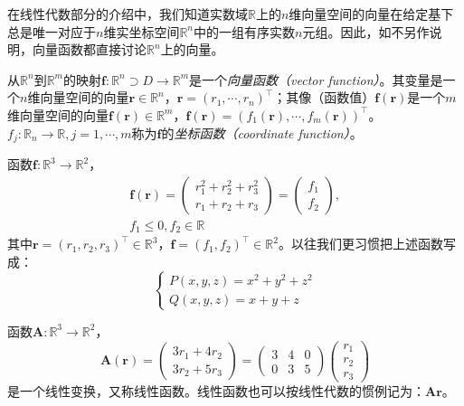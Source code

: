 \documentclass[main.tex]{subfiles}
\begin{document}
在线性代数部分的介绍中，我们知道实数域$\mathbb{R}$上的$n$维向量空间的向量在给定基下总是唯一对应于$n$维实坐标空间$\mathbb{R}^n$中的一组有序实数$n$元组。因此，如不另作说明，向量函数都直接讨论$\mathbb{R}^n$上的向量。

\begin{definition}[向量函数]\label{def:II.4.1}
    从$\mathbb{R}^n$到$\mathbb{R}^m$的映射$\mathbf{f}:\mathbb{R}^n\supset D\rightarrow\mathbb{R}^m$是一个\emph{向量函数（vector function）}。其变量是一个$n$维向量空间的向量$\mathbf{r}\in\mathbb{R}^n$，$\mathbf{r}=\left(r_1,\cdots,r_n\right)^\intercal$；其像（函数值）$\mathbf{f}\left(\mathbf{r}\right)$是一个$m$维向量空间的向量$\mathbf{f}\left(\mathbf{r}\right)\in\mathbb{R}^m$，$\mathbf{f}\left(\mathbf{r}\right)=\left(f_1\left(\mathbf{r}\right),\cdots,f_m\left(\mathbf{r}\right)\right)^\intercal$。$f_j:\mathbb{R}_n\rightarrow\mathbb{R},j=1,\cdots,m$称为$\mathbf{f}$的\emph{坐标函数（coordinate function）}。
\end{definition}



\begin{example}\label{exp:II.4.1}
    函数$\mathbf{f}:\mathbb{R}^3\rightarrow\mathbb{R}^2$，
    \[\begin{split}\mathbf{f}\left(\mathbf{r}\right)=\left(\begin{array}{c}r_1^2+r_2^2+r_3^2\\r_1+r_2+r_3\end{array}\right)=\left(\begin{array}{c}f_1\\f_2\end{array}\right),\\f_1\leq0,f_2\in\mathbb{R}\end{split}\]
    其中$\mathbf{r}=\left(r_1,r_2,r_3\right)^\intercal\in\mathbb{R}^3$，$\mathbf{f}=\left(f_1,f_2\right)^\intercal\in\mathbb{R}^2$。以往我们更习惯把上述函数写成：
    \[
        \left\{\begin{array}{l}
            P\left(x,y,z\right)=x^2+y^2+z^2 \\
            Q\left(x,y,z\right)=x+y+z
        \end{array}
        \right.
    \]
\end{example}

\begin{example}\label{exp:II.4.2}
    函数$\mathbf{A}:\mathbb{R}^3\rightarrow\mathbb{R}^2$，
    \[\mathbf{A}\left(\mathbf{r}\right)=\left(\begin{array}{c}3r_1+4r_2\\3r_2+5r_3\end{array}\right)=\left(\begin{array}{ccc}3&4&0\\0&3&5\end{array}\right)\left(\begin{array}{c}r_1\\r_2\\r_3\end{array}\right)\]
    是一个线性变换，又称线性函数。线性函数也可以按线性代数的惯例记为：$\mathbf{Ar}$。
\end{example}
\end{document}
